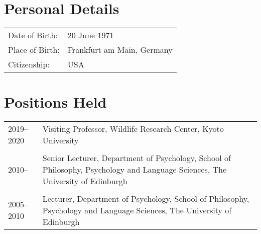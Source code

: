 \documentclass[11pt]{article}
\begin{document}

\noindent{\rule{\textwidth}{1pt}} \\


\section*{Personal Details}
\begin{tabular}{p{3cm}p{12cm}}
Date of Birth: & 20 June 1971 \\
Place of Birth: & Frankfurt am Main, Germany \\
Citizenship: & USA
\end{tabular}

\section*{Positions Held}

\begin{tabular}{p{3cm}p{12cm}}
2019--2020 & Visiting Professor, Wildlife Research Center, Kyoto University \\ \\

2010-- & Senior Lecturer, Department of Psychology, School of
Philosophy, Psychology and Language Sciences, The University of
Edinburgh \\ \\

2005--2010 & Lecturer, Department of Psychology, School of
Philosophy, Psychology and Language Sciences, The University of
Edinburgh 
\end{tabular}
\end{document}
